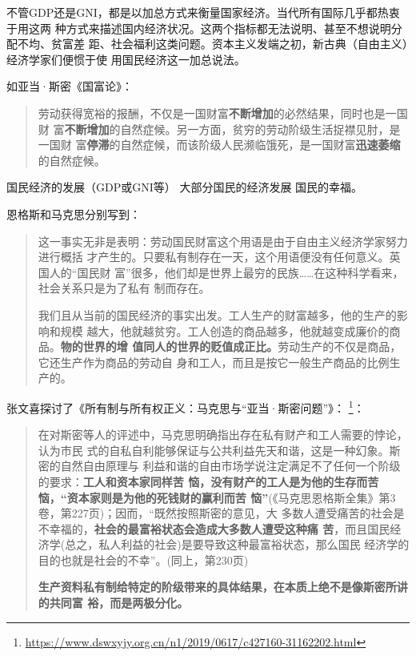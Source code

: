 不管GDP还是GNI，都是以加总方式来衡量国家经济。当代所有国际几乎都热衷于用这两
种方式来描述国内经济状况。这两个指标都无法说明、甚至不想说明分配不均、贫富差
距、社会福利这类问题。资本主义发端之初，新古典（自由主义）经济学家们便惯于使
用国民经济这一加总说法。

如亚当·斯密《国富论》：
\begin{quotation}
  劳动获得宽裕的报酬，不仅是一国财富\textbf{不断增加}的必然结果，同时也是一国财
  富\textbf{不断增加}的自然症候。另一方面，贫穷的劳动阶级生活捉襟见肘，是一国财
  富\textbf{停滞}的自然症候，而该阶级人民濒临饿死，是一国财富\textbf{迅速萎缩}的自然症候。
\end{quotation}


国民经济的发展（GDP或GNI等） \neq 大部分国民的经济发展 \neq 国民的幸福。

恩格斯和马克思分别写到：
\begin{quotation}
  这一事实无非是表明：劳动国民财富这个用语是由于自由主义经济学家努力进行概括
  才产生的。只要私有制存在一天，这个用语便没有任何意义。英国人的“国民财
  富”很多，他们却是世界上最穷的民族……在这种科学看来，社会关系只是为了私有
  制而存在。


  我们且从当前的国民经济的事实出发。工人生产的财富越多，他的生产的影响和规模
  越大，他就越贫穷。工人创造的商品越多，他就越变成廉价的商品。\textbf{物的世界的增
    值同人的世界的贬值成正比。}劳动生产的不仅是商品，它还生产作为商品的劳动自
  身和工人，而且是按它一般生产商品的比例生产的。
\end{quotation}

张文喜探讨了《所有制与所有权正义：马克思与“亚当·斯密问题”》\cite{ZXYJ201404002}：
\footnote{\url{https://www.dswxyjy.org.cn/n1/2019/0617/c427160-31162202.html}}：
\begin{quotation}
  在对斯密等人的评述中，马克思明确指出存在私有财产和工人需要的悖论，认为市民
  式的自私自利能够保证与公共利益先天和谐，这是一种幻象。斯密的自然自由原理与
  利益和谐的自由市场学说注定满足不了任何一个阶级的要求：\textbf{工人和资本家同样苦
  恼，没有财产的工人是为他的生存而苦恼，“资本家则是为他的死钱财的赢利而苦
    恼”}(《马克思恩格斯全集》第3卷，第227页)；因而，“既然按照斯密的意见，大
  多数人遭受痛苦的社会是不幸福的，\textbf{社会的最富裕状态会造成大多数人遭受这种痛
    苦}，而且国民经济学(总之，私人利益的社会)是要导致这种最富裕状态，那么国民
  经济学的目的也就是社会的不幸”。(同上，第230页)

  \textbf{生产资料私有制给特定的阶级带来的具体结果，在本质上绝不是像斯密所讲的共同富
  裕，而是两极分化。}
\end{quotation}


